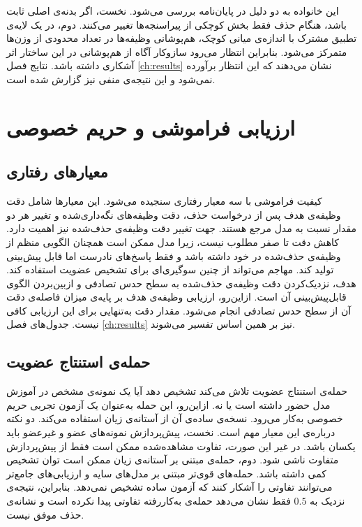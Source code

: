 این خانواده به دو دلیل در پایان‌نامه بررسی می‌شود. نخست، اگر بدنه‌ی اصلی ثابت باشد، هنگام حذف فقط بخش کوچکی از پیراسنجه‌ها تغییر می‌کنند. دوم، در یک لایه‌ی تطبیق مشترک با اندازه‌ی میانی کوچک، هم‌پوشانی وظیفه‌ها در تعداد محدودی از وزن‌ها متمرکز می‌شود. بنابراین انتظار می‌رود سازوکار آگاه از هم‌پوشانی در این ساختار اثر آشکاری داشته باشد. نتایج فصل \ref{ch:results} نشان می‌دهند که این انتظار برآورده نمی‌شود و این نتیجه‌ی منفی نیز گزارش شده است.

\section{ارزیابی فراموشی و حریم خصوصی}
\label{sec:lit-eval}

\subsection{معیارهای رفتاری}
\label{subsec:lit-metrics}

کیفیت فراموشی با سه معیار رفتاری سنجیده می‌شود. این معیارها شامل دقت وظیفه‌ی هدف پس از درخواست حذف، دقت وظیفه‌های نگه‌داری‌شده و تغییر هر دو مقدار نسبت به مدل مرجع هستند. جهت تغییر دقت وظیفه‌ی حذف‌شده نیز اهمیت دارد. کاهش دقت تا صفر مطلوب نیست، زیرا مدل ممکن است همچنان الگویی منظم از وظیفه‌ی حذف‌شده در خود داشته باشد و فقط پاسخ‌های نادرست اما قابل پیش‌بینی تولید کند. مهاجم می‌تواند از چنین سوگیری‌ای برای تشخیص عضویت استفاده کند. هدف، نزدیک‌کردن دقت وظیفه‌ی حذف‌شده به سطح حدس تصادفی و ازبین‌بردن الگوی قابل‌پیش‌بینی آن است. ازاین‌رو، ارزیابی وظیفه‌ی هدف بر پایه‌ی میزان فاصله‌ی دقت آن از سطح حدس تصادفی انجام می‌شود. مقدار دقت به‌تنهایی برای این ارزیابی کافی نیست. جدول‌های فصل \ref{ch:results} نیز بر همین اساس تفسیر می‌شوند.

\subsection{حمله‌ی استنتاج عضویت}
\label{subsec:lit-mia}

{حمله‌ی استنتاج عضویت} \cite{shokri2017membership,yeom2018privacy} تلاش می‌کند تشخیص دهد آیا یک نمونه‌ی مشخص در آموزش مدل حضور داشته است یا نه. ازاین‌رو، این حمله به‌عنوان یک آزمون تجربی حریم خصوصی به‌کار می‌رود. نسخه‌ی ساده‌ی آن از آستانه‌ی زیان استفاده می‌کند. دو نکته درباره‌ی این معیار مهم است. نخست، پیش‌پردازش نمونه‌های عضو و غیرعضو باید یکسان باشد. در غیر این صورت، تفاوت مشاهده‌شده ممکن است فقط از پیش‌پردازش متفاوت ناشی شود. دوم، حمله‌ی مبتنی بر آستانه‌ی زیان ممکن است توان تشخیص کمی داشته باشد. حمله‌های قوی‌تر مبتنی بر مدل‌های سایه \cite{carlini2022membership} و ارزیابی‌های جامع‌تر \cite{nasr2019comprehensive} می‌توانند تفاوتی را آشکار کنند که آزمون ساده تشخیص نمی‌دهد. بنابراین، نتیجه‌ی نزدیک به $0.5$ فقط نشان می‌دهد حمله‌ی به‌کاررفته تفاوتی پیدا نکرده است و نشانه‌ی حذف موفق نیست.

